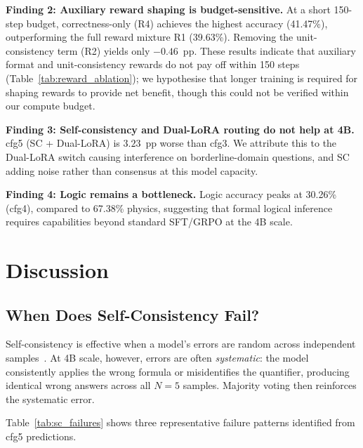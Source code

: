 \documentclass[cmc,journal,article,submit,moreauthors,pdftex]{Definitions/tsp}
\begin{document}
\textbf{Finding 2: Auxiliary reward shaping is budget-sensitive.}
At a short 150-step budget, correctness-only (R4) achieves the highest
accuracy (41.47\%), outperforming the full reward mixture R1 (39.63\%).
Removing the unit-consistency term (R2) yields only $-0.46$~pp.
These results indicate that auxiliary format and unit-consistency rewards
do not pay off within 150 steps (Table~\ref{tab:reward_ablation}); we
hypothesise that longer training is required for shaping rewards to
provide net benefit, though this could not be verified within our
compute budget.

\textbf{Finding 3: Self-consistency and Dual-LoRA routing do not help at 4B.}
cfg5 (SC + Dual-LoRA) is $3.23$~pp worse than cfg3.
We attribute this to the Dual-LoRA switch causing interference on
borderline-domain questions, and SC adding noise rather than consensus
at this model capacity.

\textbf{Finding 4: Logic remains a bottleneck.}
Logic accuracy peaks at 30.26\% (cfg4), compared to 67.38\% physics,
suggesting that formal logical inference requires capabilities beyond
standard SFT/GRPO at the 4B scale.

\section{Discussion}\label{sec:discussion}

\subsection{When Does Self-Consistency Fail?}

Self-consistency is effective when a model's errors are random across
independent samples~\cite{Wang2023sc}.
At 4B scale, however, errors are often \emph{systematic}: the model
consistently applies the wrong formula or misidentifies the quantifier,
producing identical wrong answers across all $N=5$ samples.
Majority voting then reinforces the systematic error.

Table~\ref{tab:sc_failures} shows three representative failure patterns
identified from cfg5 predictions.
\end{document}
